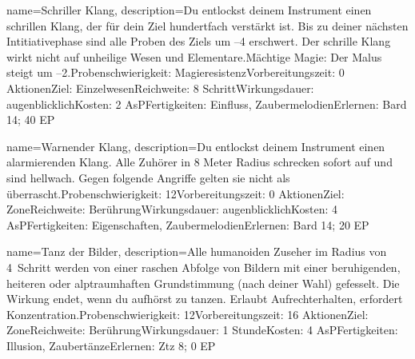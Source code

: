 {
    name={Schriller Klang},
    description={Du entlockst deinem Instrument einen schrillen Klang, der für dein Ziel hundertfach verstärkt ist. Bis zu deiner nächsten Intitiativephase sind alle Proben des Ziels um –4 erschwert. Der schrille Klang wirkt nicht auf unheilige Wesen und Elementare.\newline Mächtige Magie: Der Malus steigt um –2.\newline Probenschwierigkeit: Magieresistenz\newline Vorbereitungszeit: 0 Aktionen\newline Ziel: Einzelwesen\newline Reichweite: 8 Schritt\newline Wirkungsdauer: augenblicklich\newline Kosten: 2 AsP\newline Fertigkeiten: Einfluss, Zaubermelodien\newline Erlernen: Bard 14; 40 EP}
}


{
    name={Warnender Klang},
    description={Du entlockst deinem Instrument einen alarmierenden Klang. Alle Zuhörer in 8 Meter Radius schrecken sofort auf und sind hellwach. Gegen folgende Angriffe gelten sie nicht als überrascht.\newline Probenschwierigkeit: 12\newline Vorbereitungszeit: 0 Aktionen\newline Ziel: Zone\newline Reichweite: Berührung\newline Wirkungsdauer: augenblicklich\newline Kosten: 4 AsP\newline Fertigkeiten: Eigenschaften, Zaubermelodien\newline Erlernen: Bard 14; 20 EP}
}


{
    name={Tanz der Bilder},
    description={Alle humanoiden Zuseher im Radius von 4 Schritt werden von einer raschen Abfolge von Bildern mit einer beruhigenden, heiteren oder alptraumhaften Grundstimmung (nach deiner Wahl) gefesselt. Die Wirkung endet, wenn du aufhörst zu tanzen. Erlaubt Aufrechterhalten, erfordert Konzentration.\newline Probenschwierigkeit: 12\newline Vorbereitungszeit: 16 Aktionen\newline Ziel: Zone\newline Reichweite: Berührung\newline Wirkungsdauer: 1 Stunde\newline Kosten: 4 AsP\newline Fertigkeiten: Illusion, Zaubertänze\newline Erlernen: Ztz 8; 0 EP}
}


